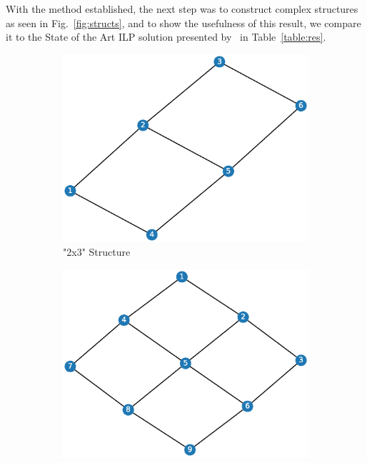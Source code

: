\documentclass{article}
\begin{document}
With the method established, the next step was to construct complex structures as seen in Fig.~\ref{fig:structs}, and to show the usefulness of this result, we compare it to the State of the Art ILP solution presented by~\citet{Culbertson2019} in Table~\ref{table:res}.

\begin{figure}[h!]
    \centering
    \begin{subfigure}[b]{0.3\textwidth}
        \centering
        \includegraphics[width=\textwidth]{figs/2x3.eps}
        \caption{"2x3" Structure}
    \end{subfigure}
    \hfill
    \begin{subfigure}[b]{0.3\textwidth}
        \centering
        \includegraphics[width=\textwidth]{figs/Lattice.eps}

\end{subfigure}
\end{figure}
\end{document}
